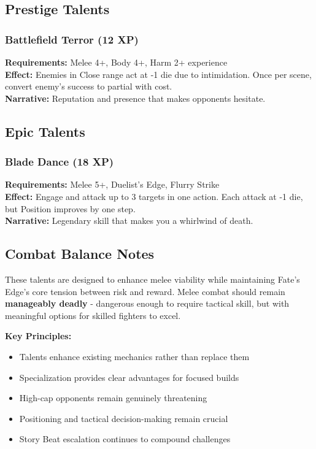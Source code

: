 \subsection{Prestige Talents}

\subsubsection{Battlefield Terror (12 XP)}
\textbf{Requirements:} Melee 4+, Body 4+, Harm 2+ experience \\
\textbf{Effect:} Enemies in Close range act at -1 die due to intimidation. Once per scene, convert enemy's success to partial with cost. \\
\textbf{Narrative:} Reputation and presence that makes opponents hesitate.

\subsection{Epic Talents}

\subsubsection{Blade Dance (18 XP)}
\textbf{Requirements:} Melee 5+, Duelist's Edge, Flurry Strike \\
\textbf{Effect:} Engage and attack up to 3 targets in one action. Each attack at -1 die, but Position improves by one step. \\
\textbf{Narrative:} Legendary skill that makes you a whirlwind of death.

\subsection{Combat Balance Notes}

These talents are designed to enhance melee viability while maintaining Fate's Edge's core tension between risk and reward. Melee combat should remain \textbf{manageably deadly} - dangerous enough to require tactical skill, but with meaningful options for skilled fighters to excel.

\textbf{Key Principles:}
\begin{itemize}
    \item Talents enhance existing mechanics rather than replace them
    \item Specialization provides clear advantages for focused builds
    \item High-cap opponents remain genuinely threatening
    \item Positioning and tactical decision-making remain crucial
    \item Story Beat escalation continues to compound challenges
\end{itemize}


